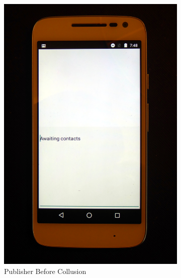 \begin{figure}[H]
	\centering
	\begin{subfigure}{0.49\textwidth}
		\centering
		\includegraphics[height=0.45\textheight]{graphics/PhonePhotos/05 - PublisherBefore.jpg}
		\caption{Publisher Before Collusion}
		\label{fig:PublisherBefore}
	\end{subfigure}
\hfill	
	\begin{subfigure}{0.49\textwidth}
		\centering

\end{subfigure}
\end{figure}

